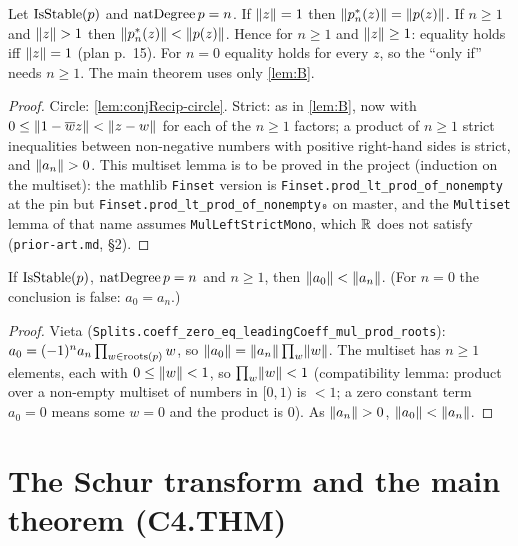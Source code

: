 \begin{lemma}\label{lem:B-strict}
Let $\stable(p)$ and $\natdeg\,p=n$. If $\nm z=1$ then
$\nm{\crec np(z)}=\nm{p(z)}$. If $n\ge1$ and $\nm z>1$ then
$\nm{\crec np(z)}<\nm{p(z)}$. Hence for $n\ge1$ and $\nm z\ge1$: equality
holds iff $\nm z=1$ (plan p.~15). For $n=0$ equality holds for every $z$, so
the ``only if'' needs $n\ge1$. The main theorem uses only \ref{lem:B}.
\end{lemma}
\begin{proof}
Circle: \ref{lem:conjRecip-circle}. Strict: as in \ref{lem:B}, now with
$0\le\nm{1-\cj wz}<\nm{z-w}$ for each of the $n\ge1$ factors; a product of $n\ge1$
strict inequalities between non-negative numbers with positive right-hand sides
is strict, and $\nm{a_n}>0$. This multiset lemma is to be proved in the project
(induction on the multiset): the mathlib \texttt{Finset} version is
\texttt{Finset.prod\_lt\_prod\_of\_nonempty} at the pin but
\texttt{Finset.prod\_lt\_prod\_of\_nonempty₀} on master, and the \texttt{Multiset}
lemma of that name assumes \texttt{MulLeftStrictMono}, which $\R$ does not
satisfy (\texttt{prior-art.md}, \S2).
\end{proof}

\begin{lemma}\label{lem:C}
If $\stable(p)$, $\natdeg\,p=n$ and $n\ge1$, then $\nm{a_0}<\nm{a_n}$. (For
$n=0$ the conclusion is false: $a_0=a_n$.)
\end{lemma}
\begin{proof}
Vieta (\texttt{Splits.coeff\_zero\_eq\_leadingCoeff\_mul\_prod\_roots}):
$a_0=(-1)^n a_n\prod_{w\in\roots p}w$, so
$\nm{a_0}=\nm{a_n}\prod_w\nm w$. The multiset has $n\ge1$ elements, each with
$0\le\nm w<1$, so $\prod_w\nm w<1$ (compatibility lemma: product over a
non-empty multiset of numbers in $[0,1)$ is $<1$; a zero constant term
$a_0=0$ means some $w=0$ and the product is $0$). As $\nm{a_n}>0$,
$\nm{a_0}<\nm{a_n}$.
\end{proof}

\chapter{The Schur transform and the main theorem (C4.THM)}

